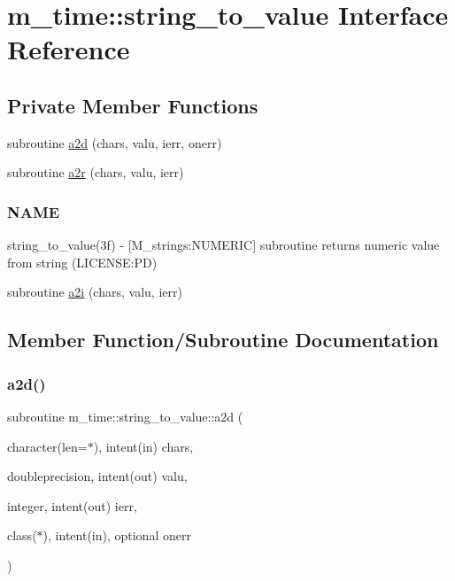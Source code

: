 \hypertarget{interfacem__time_1_1string__to__value}{}\section{m\+\_\+time\+:\+:string\+\_\+to\+\_\+value Interface Reference}
\label{interfacem__time_1_1string__to__value}
\subsection*{Private Member Functions}
\begin{DoxyCompactItemize}
\item 
subroutine \mbox{\hyperlink{interfacem__time_1_1string__to__value_acbb157ca1468d2931a9fdd52581aeb96}{a2d}} (chars, valu, ierr, onerr)
\item 
subroutine \mbox{\hyperlink{interfacem__time_1_1string__to__value_a5fa7202ea5e4570e7ab54c7ec8188f57}{a2r}} (chars, valu, ierr)
\begin{DoxyCompactList}\small\item\em \subsubsection*{N\+A\+ME}

string\+\_\+to\+\_\+value(3f) -\/ \mbox{[}M\+\_\+strings\+:N\+U\+M\+E\+R\+IC\mbox{]} subroutine returns numeric value from string (L\+I\+C\+E\+N\+SE\+:PD) \end{DoxyCompactList}\item 
subroutine \mbox{\hyperlink{interfacem__time_1_1string__to__value_a6b07c7d16ad4033167209109583282c8}{a2i}} (chars, valu, ierr)
\end{DoxyCompactItemize}


\subsection{Member Function/\+Subroutine Documentation}
\mbox{\label{interfacem__time_1_1string__to__value_acbb157ca1468d2931a9fdd52581aeb96}} 
\subsubsection{\texorpdfstring{a2d()}{a2d()}}
{\footnotesize\ttfamily subroutine m\+\_\+time\+::string\+\_\+to\+\_\+value\+::a2d (\begin{DoxyParamCaption}\item[{character(len=$\ast$), intent(in)}]{chars,  }\item[{doubleprecision, intent(out)}]{valu,  }\item[{integer, intent(out)}]{ierr,  }\item[{class($\ast$), intent(in), optional}]{onerr }\end{DoxyParamCaption})\hspace{0.3cm}{\ttfamily [private]}}

